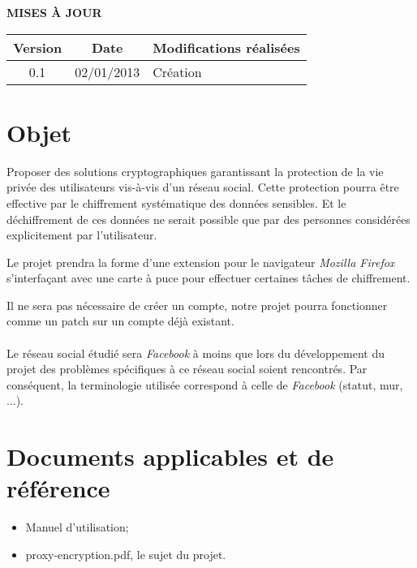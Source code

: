 \documentclass[a4paper,11pt,french]{article}
\begin{document}
\makeFirstPage
\clearpage
\vspace*{1cm}
\begin{center}
\textbf{\huge{MISES À JOUR}}\\
\vspace*{3cm}
	\begin{tabularx}{16cm}{|c|c|X|}
	\hline
	\bfseries{Version} & \bfseries{Date} & \bfseries{Modifications réalisées}\\
	\hline
	0.1 & 02/01/2013 & Création\\
	\hline
	\end{tabularx}
\end{center}

\clearpage
\tableofcontents
\clearpage


\section{Objet}
\renewcommand\labelitemi{\textbullet} %
\renewcommand\labelitemii{$\circ$} %
Proposer des solutions cryptographiques garantissant la protection de la vie 
privée des utilisateurs vis-à-vis d'un réseau social. Cette protection pourra
être effective par le chiffrement systématique des données sensibles. Et
le déchiffrement de ces données ne serait possible que par des personnes
considérées explicitement par l'utilisateur.

Le projet prendra la forme d'une extension pour le navigateur \emph{Mozilla Firefox}
s'interfaçant avec une carte à puce pour effectuer certaines tâches de chiffrement.

Il ne sera pas nécessaire de créer un compte, notre projet pourra fonctionner comme
un patch sur un compte déjà existant.

\paragraph{}
Le réseau social étudié sera \emph{Facebook} à moins que lors du développement
du projet des problèmes spécifiques à ce réseau social soient rencontrés. 
Par conséquent, la terminologie utilisée correspond à celle de \emph{Facebook} (statut, mur, ...).


\section{Documents applicables et de référence}
\begin{itemize}
    \item Manuel d'utilisation;
    \item proxy-encryption.pdf, le sujet du projet.
\end{itemize}
\end{document}
